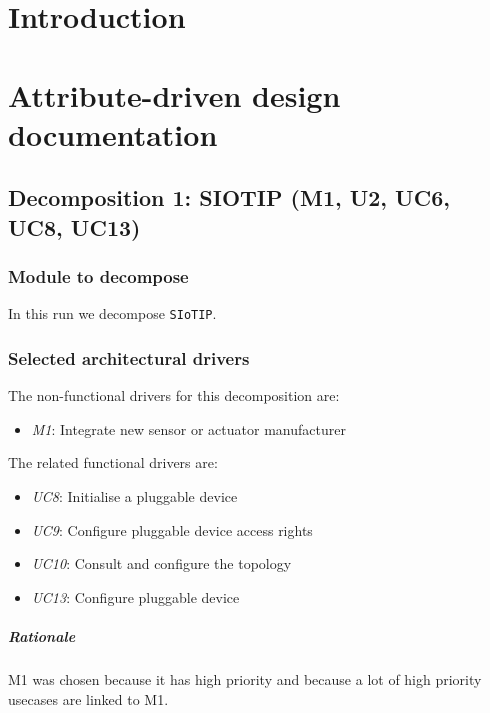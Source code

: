\documentclass[english]{sareport}
\begin{document}
\maketitle

\tableofcontents

\chapter{Introduction}\label{sec:introduction}

\chapter{Attribute-driven design documentation}\label{sec:add}
\section{Decomposition 1: SIOTIP (M1, U2, UC6, UC8, UC13)}
\subsection{Module to decompose}
In this run we decompose \texttt{SIoTIP}.

\subsection{Selected architectural drivers}
The non-functional drivers for this decomposition are:

\begin{itemize}
	\item \emph{M1}: Integrate new sensor or actuator manufacturer
\end{itemize}
The related functional drivers are:

\begin{itemize}
	\item \emph{UC8}: Initialise a pluggable device
	\item \emph{UC9}: Configure pluggable device access rights
	\item \emph{UC10}: Consult and configure the topology
	\item \emph{UC13}: Configure pluggable device
\end{itemize}

\paragraph{Rationale}
M1 was chosen because it has high priority and because a lot of high priority usecases are linked to M1. 
\end{document}
